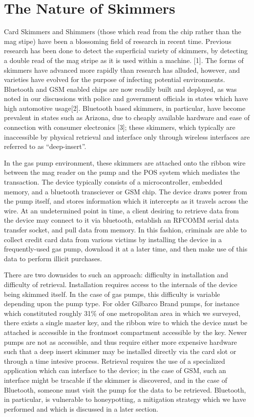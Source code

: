 \section{The Nature of Skimmers}
\label{sec:skimmernature}
Card Skimmers and Shimmers (those which read from the chip
rather than the mag stipe) have been a blossoming field of
research in recent time. Previous research has been done
to detect the superficial variety of skimmers, by detecting
a double read of the mag stripe as it is used within a machine.
[1]. The forms of skimmers have advanced more rapidly than research
has alluded, however, and varieties have evolved for the purpose of
infecting potential environments.  Bluetooth and GSM enabled chips are
now readily built and deployed, as was noted in our discussions with
police and government officials in states which have high automotive
usage[2]. Bluetooth based skimmers, in particular, have become prevalent
in states such as Arizona, due to cheaply available hardware and ease
of connection with consumer electronics [3]; these skimmers, which
typically are inaccessible by physical retrieval and interface only
through wireless interfaces are referred to as ``deep-insert''.

In the gas pump environment, these skimmers are attached onto the ribbon wire
between the mag reader on the pump and the POS system which mediates the
transaction. The device typically consists of a microcontroller, embedded
memory, and a bluetooth transciever or GSM chip. The device draws power from
the pump itself, and stores information which it intercepts as it travels
across the wire. At an undetermined point in time, a client desiring to
retrieve data from the device may connect to it via bluetooth, establish
an RFCOMM serial data transfer socket, and pull data from memory. In this
fashion, criminals are able to collect credit card data from various victims
by installing the device in a frequently-used gas pump, download it at a
later time, and then make use of this data to perform illicit purchases.

There are two downsides to such an approach: difficulty in installation 
and difficulty of retrieval. Installation requires access to the internals
of the device being skimmed itself. In the case of gas pumps, this difficulty
is variable depending upon the pump type. For older Gilbarco Brand pumps, for
instance which constituted roughly 31\% of one metropolitan area in which we
surveyed, there exists a single master key, and the ribbon wire to which the
device must be attached is accessible in the frontmost compartment accessible
by the key. Newer pumps are not as accessible, and thus require either more
expensive hardware such that a deep insert skimmer may be installed
directly via the card slot or through a time intesive process. Retrieval
requires the use of a specialized application which can interface to the
device; in the case of GSM, such an interface might be tracable if the
skimmer is discovered, and in the case of Bluetooth, someone must visit the
pump for the data to be retrieved. Bluetooth, in particular, is vulnerable to
honeypotting, a mitigation strategy which we have performed and which is
discussed in a later section.

